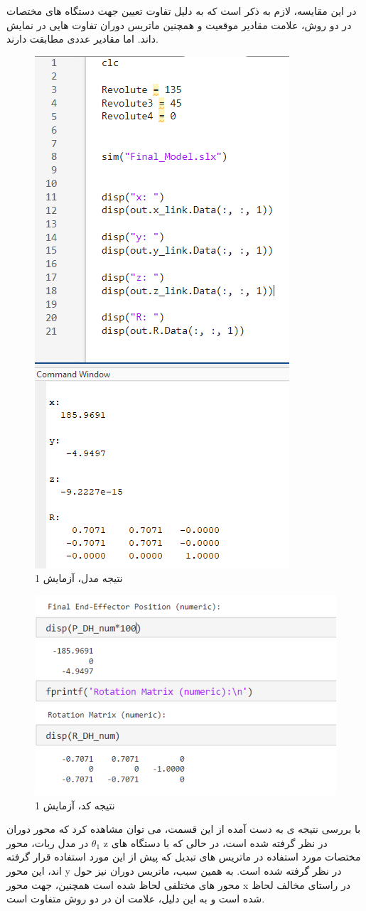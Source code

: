 \documentclass{article}
\begin{document}
در این مقایسه، لازم به ذکر است که به دلیل تفاوت تعیین جهت دستگاه های مختصات در دو روش، علامت مقادیر موقعیت و همچنین ماتریس دوران تفاوت هایی در نمایش داند. 
اما مقادیر عددی مطابقت دارند.
\begin{figure}[H]
    \centering
    \includegraphics[width=0.5\linewidth]{result1.PNG}
    \caption{نتیجه مدل، آزمایش 1}
    \label{fig:result1}
\end{figure}

\newpage

\begin{figure}[th]
    \centering
    \includegraphics[width=0.5\linewidth]{result1_screen.png}
    \caption{نتیجه کد، آزمایش 1}
    \label{fig:enter-label}
\end{figure}

با بررسی نتیجه ی به دست آمده از این قسمت، می توان مشاهده کرد که محور دوران 
$\theta_1$
در مدل ربات، محور z در نظر گرفته شده است، در حالی که با دستگاه های مختصات مورد استفاده در ماتریس های تبدیل که پیش از این مورد استفاده قرار گرفته اند، این محور y در نظر گرفته شده است.
به همین سبب، ماتریس دوران نیز حول محور های مختلفی لحاظ شده است
همچنین، جهت محور x در راستای مخالف لحاظ شده است و به این دلیل، علامت ان در دو روش متفاوت است.
\end{document}

